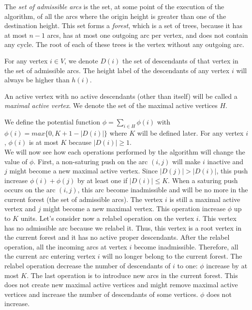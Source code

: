 The \textit{set of admissible arcs} is the set, at some point of the execution of the algorithm, of all the arcs where the origin height is greater than one of the destination height. This set forms a \textit{forest}, which is a set of trees, because it has at most $n - 1$ arcs, has at most one outgoing arc per vertex, and does not contain any cycle. The root of each of these trees is the vertex without any outgoing arc. 

For any vertex $i \in V$, we denote $D(i)$ the set of descendants of that vertex in the set of admissible arcs. The height label of the descendants of any vertex $i$ will always be higher than $h(i)$. 

An active vertex with no active descendants (other than itself) will be called a \textit{maximal active vertex}. We denote the set of the maximal active vertices $H$.

We define the potential function $\phi = \sum_{i \in H} \phi(i)$ with $\phi(i) = max\{0, K + 1 - |D(i)|\}$ where $K$ will be defined later. For any vertex $i$, $\phi(i)$ is at most $K$ because $|D(i)| \ge 1$.\\

We will now see how each operations performed by the algorithm will change the value of $\phi$. First, a non-saturing push on the arc $(i, j)$ will make $i$ inactive and $j$ might become a new maximal active vertex. Since $|D(j)| > |D(i)|$, this push increase $\phi(i) + \phi(j)$ by at least one if $|D(i)| \le K$. When a saturing push occurs on the arc $(i, j)$, this arc become inadmissible and will be no more in the current forest (the set of admissible arcs). The vertex $i$ is still a maximal active vertex and $j$ might become a new maximal vertex. This operation increase $\phi$ up to $K$ units. Let's consider now a relabel operation on the vertex $i$. This vertex has no admissible arc because we relabel it. Thus, this vertex is a root vertex in the current forest and it has no active proper descendants. After the relabel operation, all the incoming arcs at vertex $i$ become inadmissible. Therefore, all the current arc entering vertex $i$ will no longer belong to the current forest. The relabel operation decrease the number of descendants of $i$ to one: $\phi$ increase by at most $K$. The last operation is to introduce new arcs in the current forest. This does not create new maximal active vertices and might remove maximal active vertices and increase the number of descendants of some vertices. $\phi$ does not increase.\\

